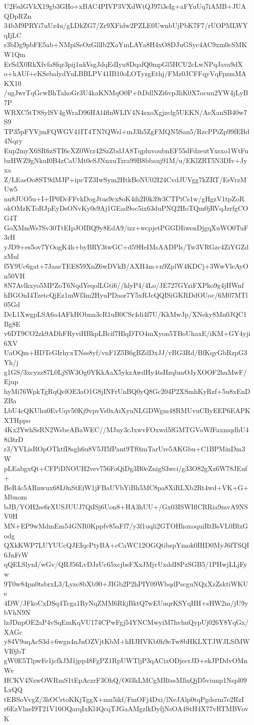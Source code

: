 U2FsdGVkX19gb3GHo+xBAC4PIVP3VXdWtQJ97i3eIg+aFYuUq7iAMB+JUAQDpRZn
34bM9PRYi7uUz4u/gLDkZG7/Zr9XFidw2PZLE0UwnbUjPbK7F7/rUOPMLWYqIjLC
r3bDg9pbFE5ab+NMpiSeOzGllIb2XaYmLAYa8H4xO8DJuGSyc4AC9xm0cSMKW1Qm
ErSdX0RkXfvfa8fqr3pij1nkVsgJdqEdIyu8DqafQ0mpGl5HCU2cLwNPqJava9dX
o+hAUf+cKSebalydYuLBBLPV41IB10oLOTyzgEthj/FMz0JCFFqyVqFpzmMAKX10
/ugJwrTqGcwBhTahoGr3U4kaKNMqO0P+ftDdlNZi6vp3liK0X7ocuu2YW4jLyB7P
WRXC5tT8SylSV4gWraD96HAl4flnWLIV4N4sxoXgjzclg5UEKN/AeXanSB40w7S9
TP35pFYVjmFQWGV41IT4TN7QWsl+mJ3h5ZgFMQN5San5/RzcPPiZp99fEBd4Nqry
Eup2myX6SR6zSTI6cXZ0Wrz42SzZbdJA8TqpluvoubnEF55dFdzeutYxsxo1WtFu
bzHWZ9gNkuI0B4zCaUMt0eSJNnxuTzra99B8bbauj91M/u/EKlZRT5N3DIv+Jyxa
Z/LEasOo8ST9dMJP+ipcTZ3IwSym2HtkBoNU02I24CvdJUVgg7kZRT/EeVrzMUw5
nu8JUO5u+I+IP0DcFFvkDogJtus9cx8oK4ih2I0k39r3CTPiCs1w/gHgzV1tpZoR
okOMzKToRJpEyDsONvKy0s9Aj1GEad9oc5ix63duPNQ2HoTQm0jRVqJzrfgCOG4T
GoXMmWs7Sv30TtEIpJOIBQ9y8EdA9/izz+wcpjetPGGDIiwenDjgqXuWO0TuF3rH
yJD9+es5ov7YOogK4h+byBRY3twGC+d59HeIMsAADPls/Tw3VRGzc4ZiYGZdzMul
f5Y9Uc6gat+7JaaeTEE859XnZ6wDVkB/AXH4m+n9ZplW4KDCj+3WwVleAyOn50VH
8N7Avlkxyo5MPZoT6NqdYeqolLGti6//hlyP4/4Lo/JE727GYziFXPko9g4jHWnf
hBGOnI4TzetcQjEz1mWf3m2HyuPDaor7Y5xRJcQQISiGKRDdOUoc/6M07MTl05Gd
DcL1XwgpLSA6a4AFkHObnn3cR1uB0CSr4di4f7U/KkMwJp/XNeky8Mn0JQC1Bg8E
v6DT9CO2zk9ADhFRyviHBkpLBcif7HlqDTO4mXyon5TBoUhaxE/iKM+GY4yji6XV
UaOQm+HDTeGIrhyxTNss8yf/vnF1Z5B6gBZdDxJJ/vBG3Rd/BfKqyGbRzpG3Yh/j
g1GS/3xcyzz87L0LjSW3Og0YKkAaX5ykzAwdHy4tsHzqbmOJyXOOF2huMwF/Ejup
hyMi76WpkTgRqQelOE3aO1G8jINFrUnBQ0yQ8Gc204P2XSmhKyRzf+5u8xEnDZBa
LbU4cQKUhu0EvUqv50Kj9vpvVs0xAiXyuNLGDWgm48RMUvuCByEEP6EAPKXTHppo
4Kx2YwhSsRN2WsbeABaWEC//MJuy3cJxwvFOxwd5fGMTGVoWfFaxmqdhU48i3trD
r3/YVLisROpOTktfI8sgh6u8V5JI5fPant9Tf0imTarUre5AKGbu+C1BPMinDm3W
pLEabgxQt+CFPiDNOUH2vev756FoQiDg3B0eZnigS3wci/g33O82gXz6W78JEuf+
BeR4c5ARnwux68L0nStEiW1jFBaUVbYiBh5MC8pa8XiRLXb2Rt4wd+VK+G+Mbnom
bJB/YOH2se6rXUSJUUJ7QiISj6Uon8+HA3hUU+/Gx03ISWIflCRRia9mvA9NSV0H
MN+EP9wMdmEm54GNR0Kppfv85aFf7/y3f1uqli2GTOHhoxoquiRtBsVL0BlxGodg
QXkKWP7LUYUUcQJEIqcPtyBA+cCaWC12OGQtibspYmok0IHD0MyJ6fTSQI6JnFrW
qQELSlynI/wGv/QRJ56LvDJzUc65xcjbsFXxJMjvUxddI8PzSGB5/1PHwjLLjFyw
9T0w84pn0tsbrxL3/Lyzc8bXb90+JIGb2P2hPIY09WbqdPscguNQxXzZsktiWKUe
4DW/JFkoCxDSq4Tcga1RyNqZMM6RkjBktQ7wEUuqrKSYqHH+sHW2m/jU9ybVhN9N
lzJDnpOE2aP4vSqEmKqVU174CPwFgj54YNCMwyiM7hvhuQypUj026Y8YqGx/XAGc
y84V9uqAcS3d+6wgn4nJnOZVjtKbM+hHJHVKb0h9eTw8bHKLXTJWJLSfMWVI0jbT
gW0E5TlpwFe1jcfkJM1jpp48FgPZ1RpUWTljP3qACixODjecrJD+ekJPDdvOMnWv
HCKV4NzwOWRmS1tEpAczrF3OhQ/O03hLMCgMRtssMllnQjD5viunp1Nspl09LxQQ
tEBSoVvgZ/3hOCrtoKKjTggX+mu5ikf/FmOFj4Dxi/lNeJAlp0tqPgdsrm7e2RzI
r6EzVlneI9T21V16OQarqIxKl4QcqTJGaAMgzlkDyfjNsOA4StH4X77vRTMBVovK
